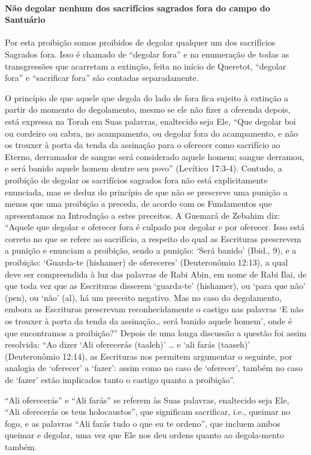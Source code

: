 \paragraph{Não degolar nenhum dos sacrifícios sagrados fora do campo do Santuário}

Por esta proibição somos proibidos de degolar qualquer um dos
sacrifícios Sagrados fora. Isso é chamado de ``degolar fora'' e na
enumeração de todas as transgressões que acarretam a extinção, feita no
início de Queretot, ``degolar fora'' e ``sacrificar fora'' são contadas
separadamente.

O princípio de que aquele que degola do lado de fora fica sujeito à
extinção a partir do momento do degolamento, mesmo se ele não fizer a
oferenda depois, está expressa na Torah em Suas palavras, enaltecido
seja Ele, ``Que degolar boi ou cordeiro ou cabra, no acampamento, ou
degolar fora do acampamento, e não os trouxer à porta da tenda da
assinação para o oferecer como sacrifício ao Eterno, derramador de
sangue será considerado aquele homem; sangue derramou, e será banido
aquele homem dentre seu povo'' (Levítico 17:3-4). Contudo, a proibição
de degolar os sacrifícios sagrados fora não está explicitamente
enunciada, mas se deduz do princípio de que não se prescreve uma
punição a menos que uma proibição a preceda, de acordo com os
Fundamentos que apresentamos na Introdução a estes preceitos. A Guemará
de Zebahim diz: ``Aquele que degolar e oferecer fora é culpado por
degolar e por oferecer. Isso está correto no que se refere ao
sacrifício, a respeito do qual as Escrituras prescrevem a punição e enunciam a proibição, sendo a punição: `Será banido' (Ibid., 9),
e a proibição: `Guarda-te (hishamer) de ofereceres' (Deuteronômio
12:13), a qual deve ser compreendida à luz das palavras de Rabi Abin, em
nome de Rabi Ilai, de que toda vez que as Escrituras disserem
`guarda-te' (hishamer), ou `para que não' (pen), ou `não' (al), há um
preceito negativo. Mas no caso do degolamento, embora as Escrituras
prescrevam reconhecidamente o castigo nas palavras `E não os trouxer à
porta da tenda da assinação\ldots{} será banido aquele homem', onde é que
encontramos a proibição?'' Depois de uma longa discussão a questão foi
assim resolvida: ``Ao dizer `Ali oferecerás (taaleh)' \ldots{} e `ali farás
(taaseh)' (Deuteronômio 12:14), as Escrituras nos permitem argumentar o
seguinte, por analogia de `oferecer' a `fazer': assim como no caso de
`oferecer', também no caso de `fazer' estão implicados tanto o castigo
quanto a proibição''.

``Ali oferecerás'' e ``Ali farás'' se referem às Suas palavras,
enaltecido seja Ele, ``Ali oferecerás os teus holocaustos'', que
significam sacrificar, i.e., queimar no fogo, e as palavras ``Ali farás
tudo o que eu te ordeno'', que incluem ambos queimar e degolar, uma vez
que Ele nos deu ordens quanto ao degola-mento também.

